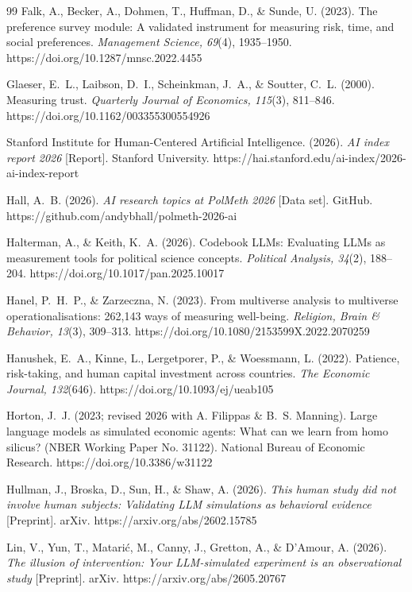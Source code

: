 \documentclass[10pt,letterpaper]{article}
\begin{document}
\begin{thebibliography}{99}
 Falk, A., Becker, A., Dohmen, T., Huffman, D., \& Sunde, U. (2023). The preference survey module: A validated instrument for measuring risk, time, and social preferences. \textit{Management Science, 69}(4), 1935--1950. https://doi.org/10.1287/mnsc.2022.4455

 Glaeser, E.~L., Laibson, D.~I., Scheinkman, J.~A., \& Soutter, C.~L. (2000). Measuring trust. \textit{Quarterly Journal of Economics, 115}(3), 811--846. https://doi.org/10.1162/003355300554926

 Stanford Institute for Human-Centered Artificial Intelligence. (2026). \textit{AI index report 2026} [Report]. Stanford University. https://hai.stanford.edu/ai-index/2026-ai-index-report

 Hall, A.~B. (2026). \textit{AI research topics at PolMeth 2026} [Data set]. GitHub. https://github.com/andybhall/polmeth-2026-ai

 Halterman, A., \& Keith, K.~A. (2026). Codebook LLMs: Evaluating LLMs as measurement tools for political science concepts. \textit{Political Analysis, 34}(2), 188--204. https://doi.org/10.1017/pan.2025.10017

 Hanel, P.~H.~P., \& Zarzeczna, N. (2023). From multiverse analysis to multiverse operationalisations: 262,143 ways of measuring well-being. \textit{Religion, Brain \& Behavior, 13}(3), 309--313. https://doi.org/10.1080/2153599X.2022.2070259

 Hanushek, E.~A., Kinne, L., Lergetporer, P., \& Woessmann, L. (2022). Patience, risk-taking, and human capital investment across countries. \textit{The Economic Journal, 132}(646). https://doi.org/10.1093/ej/ueab105

 Horton, J.~J. (2023; revised 2026 with A. Filippas \& B.~S. Manning). Large language models as simulated economic agents: What can we learn from homo silicus? (NBER Working Paper No. 31122). National Bureau of Economic Research. https://doi.org/10.3386/w31122

 Hullman, J., Broska, D., Sun, H., \& Shaw, A. (2026). \textit{This human study did not involve human subjects: Validating LLM simulations as behavioral evidence} [Preprint]. arXiv. https://arxiv.org/abs/2602.15785

 Lin, V., Yun, T., Matari\'c, M., Canny, J., Gretton, A., \& D'Amour, A. (2026). \textit{The illusion of intervention: Your LLM-simulated experiment is an observational study} [Preprint]. arXiv. https://arxiv.org/abs/2605.20767


\end{thebibliography}
\end{document}
